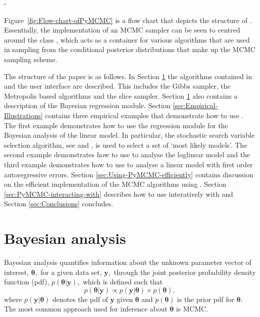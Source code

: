 -\documentclass[article]{jss}
\begin{document}
Figure~\ref{fig:Flow-chart-ofPyMCMC} is a flow chart that depicts
the structure of . Essentially, the implementation of an MCMC
sampler can be seen to centred around the class , which
acts as a container for various algorithms that are used in sampling
from the conditional posterior distributions that make up the MCMC
sampling scheme. 

The structure of the paper is as follows. In Section
\ref{sec:Bayesian-Analysis} the algorithms contained in 
and the user interface are described.  This includes the Gibbs
sampler, the Metropolis based algorithms and the slice sampler.
Section \ref{sec:Bayesian-Analysis} also contains a description of the
Bayesian regression module. Section \ref{sec:Empirical-Illustrations}
contains three empirical examples that demonstrate how to use
.  The first example demonstrates how to use the
regression module for the Bayesian analysis of the linear model. In
particular, the stochastic search variable selection algorithm, see
\citet{GeorgeMcCulloch1993} and \citet{MarinRobert2007}, is used to
select a set of `most likely models'. The second example demonstrates
how to use  to analyse the loglinear model and the third
example demonstrates how to use  to analyse a linear model
with first order autoregressive errors.  Section
\ref{sec:Using-PyMCMC-efficiently} contains discussion on the
efficient implementation of the MCMC algorithms using .
Section \ref{sec:PyMCMC-interacting-with} describes how to use
 interatively with  and Section
\ref{sec:Conclusions} concludes.


\section{Bayesian analysis}
\label{sec:Bayesian-Analysis}

Bayesian analysis quantifies information about the unknown parameter
vector of interest, $\bm{\theta},$ for a given data set, $\bm{y},$
through the joint posterior probability density function (pdf),
$p(\bm{\theta}|\bm{y}),$ which is defined such that \begin{equation}
  p(\bm{\theta}|\bm{y})\propto p(\bm{y}|\bm{\theta})\times
  p(\bm{\theta}),\label{eq:joint post}\end{equation} where
$p(\bm{y}|\bm{\theta})$ denotes the pdf of $\bm{y}$ given
$\bm{\theta}$ and $p(\bm{\theta})$ is the prior pdf for $\bm{\theta}.$
The most common approach used for inference about $\bm{\theta}$ is
MCMC.
\end{document}
